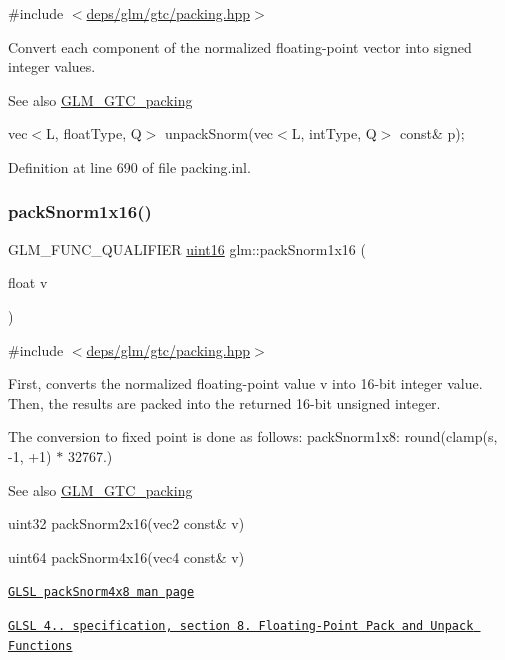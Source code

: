 {\ttfamily \#include $<$\hyperlink{gtc_2packing_8hpp}{deps/glm/gtc/packing.\+hpp}$>$}

Convert each component of the normalized floating-\/point vector into signed integer values.

\begin{DoxySeeAlso}{See also}
\hyperlink{group__gtc__packing}{G\+L\+M\+\_\+\+G\+T\+C\+\_\+packing} 

vec$<$\+L, float\+Type, Q$>$ unpack\+Snorm(vec$<$\+L, int\+Type, Q$>$ const\& p); 
\end{DoxySeeAlso}


Definition at line 690 of file packing.\+inl.

\mbox{\label{group__gtc__packing_gac29411d6c0f6ed0fe9f0396dfe92e0e8}} 
\subsubsection{\texorpdfstring{pack\+Snorm1x16()}{packSnorm1x16()}}
{\footnotesize\ttfamily G\+L\+M\+\_\+\+F\+U\+N\+C\+\_\+\+Q\+U\+A\+L\+I\+F\+I\+ER \hyperlink{group__gtc__type__precision_gad8c2939e1fdd8e5828b31d95c52255d5}{uint16} glm\+::pack\+Snorm1x16 (\begin{DoxyParamCaption}\item[{float}]{v }\end{DoxyParamCaption})}



{\ttfamily \#include $<$\hyperlink{gtc_2packing_8hpp}{deps/glm/gtc/packing.\+hpp}$>$}

First, converts the normalized floating-\/point value v into 16-\/bit integer value. Then, the results are packed into the returned 16-\/bit unsigned integer.

The conversion to fixed point is done as follows\+: pack\+Snorm1x8\+: round(clamp(s, -\/1, +1) $\ast$ 32767.)

\begin{DoxySeeAlso}{See also}
\hyperlink{group__gtc__packing}{G\+L\+M\+\_\+\+G\+T\+C\+\_\+packing} 

uint32 pack\+Snorm2x16(vec2 const\& v) 

uint64 pack\+Snorm4x16(vec4 const\& v) 

\href{http://www.opengl.org/sdk/docs/manglsl/xhtml/packSnorm4x8.xml}{\tt G\+L\+SL pack\+Snorm4x8 man page} 

\href{http://www.opengl.org/registry/doc/GLSLangSpec.4.20.8.pdf}{\tt G\+L\+SL 4.. specification, section 8. Floating-\/\+Point Pack and Unpack Functions} 
\end{DoxySeeAlso}


